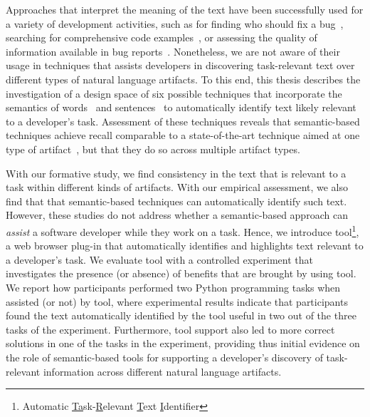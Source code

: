 Approaches that interpret the meaning of the text have been successfully used for a variety of development activities,
such as for finding who should fix a bug~\cite{yang2016}, searching for comprehensive code examples~\cite{silva2019}, or assessing the quality of information available in bug reports~\cite{chaparro2019}.
Nonetheless, we are not aware of their usage in techniques 
that assists developers in discovering task-relevant text over different types of natural language artifacts.
To this end, this thesis describes the investigation of a design space
of six possible techniques that incorporate the semantics of words~\cite{Mikolov2013, Devlin2018Bert}
and sentences~\cite{fillmore1976frame, marques2021}
to automatically identify text likely relevant to a developer's task.
Assessment of these techniques reveals that semantic-based techniques
achieve recall comparable to a state-of-the-art technique aimed at one type of artifact~\cite{Xu2017}, but 
that they do so across
multiple artifact types.






With our formative study, we find consistency in the text  that is relevant to a task within different kinds of artifacts.
With our empirical assessment, we also find that that semantic-based techniques can automatically identify such text.
However, these studies do not address whether a semantic-based approach can \textit{assist} a software developer while they work on a task.
Hence, we introduce \acs{tool}\footnote{
    Automatic \underline{Ta}sk-\underline{R}elevant \underline{T}ext \underline{I}dentifier
}, a web browser plug-in that 
automatically identifies and highlights text relevant to a developer's task.
We evaluate \acs{tool} with a controlled experiment that investigates the presence (or absence) of benefits that are brought by using \acs{tool}.
We report how  participants 
performed two Python programming tasks when 
 assisted (or not) by \acs{tool},
where experimental results indicate that participants found the text automatically identified
by the tool 
useful in two out of the three tasks of the experiment.
Furthermore, tool support also led to more correct solutions 
in one of the tasks in the experiment, providing thus
initial evidence on the role of semantic-based tools 
for supporting a developer's discovery of task-relevant information
across different natural language artifacts.

